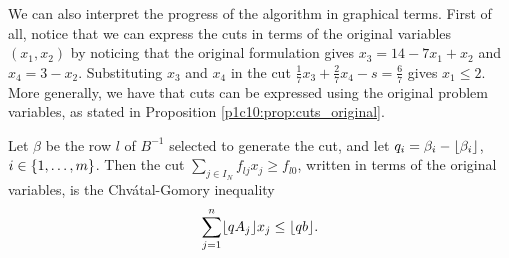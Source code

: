 We can also interpret the progress of the algorithm in graphical terms. First of all, notice that we can express the cuts in terms of the original variables $(x_1,x_2)$ by noticing that the original formulation gives $x_3 = 14 - 7x_1 + x_2$ and $x_4 = 3-x_2$. Substituting $x_3$ and $x_4$ in the cut $\frac{1}{7}x_3 + \frac{2}{7}x_4 - s = \frac{6}{7}$ gives $x_1 \leq 2$. More generally, we have that cuts can be expressed using the original problem variables, as stated in Proposition \ref{p1c10:prop:cuts_original}.

\begin{proposition} \label{p1c10:prop:cuts_original}
     Let $\beta$ be the row $l$ of $B^{-1}$ selected to generate the cut, and let $q_i = \beta_i - \lfloor \beta_i \rfloor$, $i \in \left\{ 1,\dots, m \right \}$. Then the cut $\sum_{j \in I_N}f_{lj}x_j \geq f_{l0}$, written in terms of the original variables, is the Chv\'atal-Gomory inequality 
 $$ \sum_{j=1}^n \lfloor qA_j \rfloor x_j \leq \lfloor qb \rfloor. $$
 \end{proposition}

